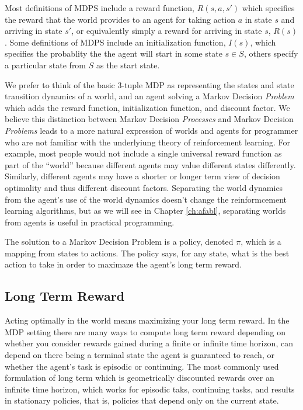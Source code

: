 Most definitions of MDPS include a reward function, $R(s, a, s')$ which specifies the reward that the world provides to an agent for taking action $a$ in state $s$ and arriving in state $s'$, or equivalently simply a reward for arriving in state $s$, $R(s)$. Some definitions of MDPS include an initialization function, $I(s)$, which specifies the probablity the the agent will start in some state $s \in S$, others specify a particular state from $S$ as the start state.

We prefer to think of the basic 3-tuple MDP as representing the states and state transition dynamics of a world, and an agent solving a Markov Decision {\it Problem} which adds the reward function, initialization function, and discount factor. We believe this distinction between Markov Decision {\it Processes} and Markov Decision {\it Problems} leads to a more natural expression of worlds and agents for programmer who are not familiar with the underlyiung theory of reinforcement learning. For example, most people would not include a single universal reward function as part of the ``world'' because different agents may value different states differently. Similarly, different agents may have a shorter or longer term view of decision optimality and thus different discount factors. Separating the world dynamics from the agent's use of the world dynamics doesn't change the reinformcement learning algorithms, but as we will see in Chapter \ref{ch:afabl}, separating worlds from agents is useful in practical programming.

The solution to a Markov Decision Problem is a policy, denoted $\pi$, which is a mapping from states to actions. The policy says, for any state, what is the best action to take in order to maximaze the agent's long term reward.

\subsection{Long Term Reward}

Acting optimally in the world means maximizing your long term reward. In the MDP setting there are many ways to compute long term reward depending on whether you consider rewards gained during a finite or infinite time horizon, can depend on there being a terminal state the agent is guaranteed to reach, or whether the agent's task is episodic or continuing. The most commonly used formulation of long term which is geometrically discounted rewards over an infinite time horizon, which works for episodic taks, continuing tasks, and results in stationary policies, that is, policies that depend only on the current state.

